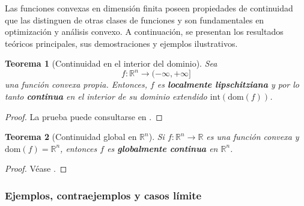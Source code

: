 \documentclass[12pt]{book}
\newtheorem{theorem}{Teorema}
\theoremstyle{definition}
\theoremstyle{plain}
\theoremstyle{remark}
\begin{document}
Las funciones convexas en dimensión finita poseen propiedades de continuidad que las distinguen de otras clases de funciones y son fundamentales en optimización y análisis convexo. A continuación, se presentan los resultados teóricos principales, sus demostraciones y ejemplos ilustrativos.

\begin{theorem}[Continuidad en el interior del dominio]
\label{thm:continuidad_interior}
Sea \[ f: \mathbb{R}^n \to (-\infty, +\infty] \] una función convexa propia. Entonces, \( f \) es \textbf{localmente lipschitziana} y por lo tanto \textbf{continua} en el interior de su dominio extendido \( \text{int}(\text{dom}(f)) \).
\end{theorem}

\begin{proof}
La prueba  puede consultarse en \cite[Sección 2.1.2]{BoydVandenberghe2004}. %
\end{proof}

\begin{theorem}[Continuidad global en \( \mathbb{R}^n \)]
\label{thm:continuidad_globa}
Si \( f: \mathbb{R}^n \to \mathbb{R} \) es una función convexa y \( \text{dom}(f) = \mathbb{R}^n \), entonces \( f \) es \textbf{globalmente continua} en \( \mathbb{R}^n \).
\end{theorem}

\begin{proof}
Véase \cite[Teorema 10.1]{Rockafellar1970}.
\end{proof}

\subsubsection{Ejemplos, contraejemplos y casos límite}
\end{document}

